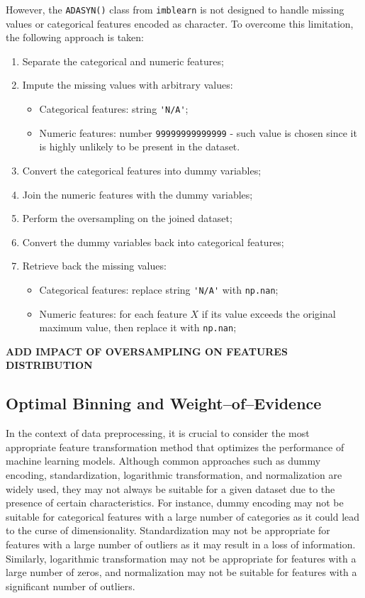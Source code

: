 However, the \lstinline{ADASYN()} class from \lstinline{imblearn} is not designed to handle missing values or categorical features encoded as character. To overcome this limitation, the following approach is taken:
\begin{enumerate}\setlength\itemsep{0em} 
\item Separate the categorical and numeric features;
\item Impute the missing values with arbitrary values:
\begin{itemize}
\item Categorical features: string \lstinline{'N/A'};
\item Numeric features: number \lstinline{99999999999999} - such value is chosen since it is highly unlikely to be present in the dataset.
\end{itemize}
\item Convert the categorical features into dummy variables;
\item Join the numeric features with the dummy variables;
\item Perform the oversampling on the joined dataset;
\item Convert the dummy variables back into categorical features;
\item Retrieve back the missing values:
\begin{itemize}
\item Categorical features: replace string \lstinline{'N/A'} with \lstinline{np.nan};
\item Numeric features: for each feature $X$ if its value exceeds the original maximum value, then replace it with \lstinline{np.nan};
\end{itemize}
\end{enumerate}

\textbf{ADD IMPACT OF OVERSAMPLING ON FEATURES DISTRIBUTION}

\subsection{Optimal Binning and Weight--of--Evidence}
\label{subsec:prep-optbinning}

In the context of data preprocessing, it is crucial to consider the most appropriate feature transformation method that optimizes the performance of machine learning models.
Although common approaches such as dummy encoding, standardization, logarithmic transformation, and normalization are widely used, they may not always be suitable for a given dataset due to the presence of certain characteristics.
For instance, dummy encoding may not be suitable for categorical features with a large number of categories as it could lead to the curse of dimensionality.
Standardization may not be appropriate for features with a large number of outliers as it may result in a loss of information.
Similarly, logarithmic transformation may not be appropriate for features with a large number of zeros, and normalization may not be suitable for features with a significant number of outliers.

